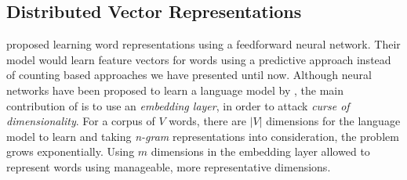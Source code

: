 \subsection{Distributed Vector Representations}%
\label{sub:distributed_vector_representations}



\textcite{bengio_neural_2003} proposed learning word representations using a feedforward neural network.
Their model would learn feature vectors for words using a predictive approach instead of counting based approaches we have presented until now.
Although neural networks have been proposed to learn a language model by \textcite{xu_can_2000}, the main contribution of \citeauthor{bengio_neural_2003} is to use an \emph{embedding layer}, in order to attack \emph{curse of dimensionality}.
For a corpus of $V$ words, there are $|V|$ dimensions for the language model to learn and taking \emph{n-gram} representations into consideration, the problem grows exponentially.
Using $m$ dimensions in the embedding layer allowed \citeauthor{bengio_neural_2003} to represent words using manageable, more representative dimensions.

